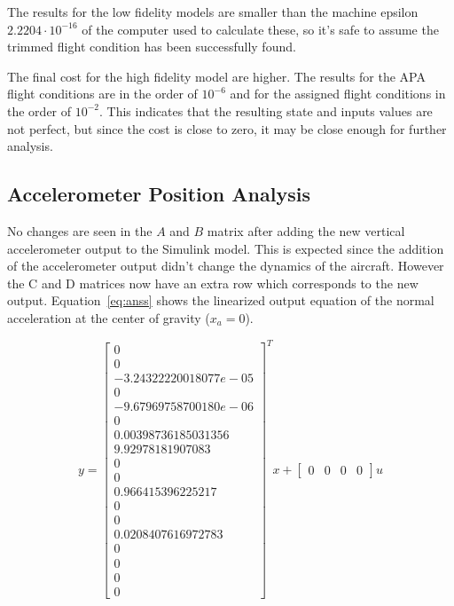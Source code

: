 The results for the low fidelity models are smaller than the machine epsilon $2.2204\cdot10^{-16}$ of the computer used to calculate these, so it's safe to assume the trimmed flight condition has been successfully found. 

The final cost for the high fidelity model are higher. The results for the APA flight conditions are in the order of $10^{-6}$ and for the assigned flight conditions in the order of $10^{-2}$. This indicates that the resulting state and inputs values are not perfect, but since the cost is close to zero, it may be close enough for further analysis.


\subsection{Accelerometer Position Analysis}
No changes are seen in the $A$ and $B$ matrix after adding the new vertical accelerometer output to the Simulink model. This is expected since the addition of the accelerometer output didn't change the dynamics of the aircraft. However the C and D matrices now have an extra row which corresponds to the new output. Equation~\ref{eq:anss} shows the linearized output equation of the normal acceleration at the center of gravity ($x_a=0$).

\begin{equation}
    \label{eq:anss}
    y = \begin{bmatrix}
        0 \\ 0 \\ -3.24322220018077e-05 \\ 0 \\ -9.67969758700180e-06 \\ 0 \\ 
        0.00398736185031356 \\ 9.92978181907083 \\ 0 \\ 0 \\ 0.966415396225217 \\ 
        0 \\ 0 \\ 0.0208407616972783 \\ 0 \\ 0 \\ 0 \\ 0
        \end{bmatrix}^T x + 
        \begin{bmatrix}
        0 & 0 & 0 & 0
    \end{bmatrix} u
\end{equation}

